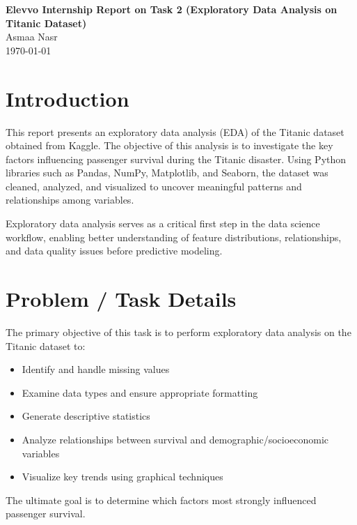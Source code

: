 \documentclass[a4paper,12pt]{report}
\begin{document}
\begin{center}
    \Huge \textbf{Elevvo Internship Report on Task 2 (Exploratory Data Analysis on Titanic Dataset)} \\
    \vspace{0.5cm}
    \Large Asmaa Nasr \\
    \vspace{0.5cm}
    \Large \today
\end{center}


\section{Introduction}
This report presents an exploratory data analysis (EDA) of the Titanic dataset obtained from Kaggle. The objective of this analysis is to investigate the key factors influencing passenger survival during the Titanic disaster. Using Python libraries such as Pandas, NumPy, Matplotlib, and Seaborn, the dataset was cleaned, analyzed, and visualized to uncover meaningful patterns and relationships among variables.

Exploratory data analysis serves as a critical first step in the data science workflow, enabling better understanding of feature distributions, relationships, and data quality issues before predictive modeling.

\section{Problem / Task Details}
The primary objective of this task is to perform exploratory data analysis on the Titanic dataset to:
\begin{itemize}

\item Identify and handle missing values

\item Examine data types and ensure appropriate formatting

\item Generate descriptive statistics

\item Analyze relationships between survival and demographic/socioeconomic variables

\item Visualize key trends using graphical techniques
\end{itemize}

The ultimate goal is to determine which factors most strongly influenced passenger survival.
\end{document}

